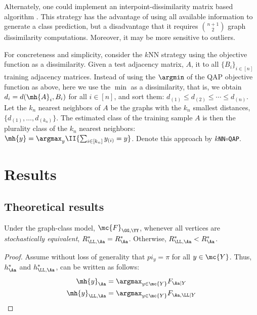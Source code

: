 \documentclass[10pt,journal,cspaper,compsoc]{IEEEtran}
\begin{document}
Alternately, one could implement an interpoint-dissimilarity matrix based algorithm \cite{Duin2011}. This strategy has the advantage of using all available information to generate a class prediction, but a disadvantage that it requires $\binom{n+1}{2}$ graph dissimilarity computations. Moreover, it may be more sensitive to outliers.

For concreteness and simplicity, consider the $k$NN strategy using the \qap objective function as a dissimilarity.  Given a test adjacency matrix, $A$, \qap it to all $\{B_i\}_{i \in [n]}$ training adjacency matrices.  Instead of using the $\argmin$ of the QAP objective function as above, here we use the $\min$ as a dissimilarity, that is, we obtain $d_i=d(\mh{A}_i,B_i)$ for all $i \in [n]$, and sort them: $d_{(1)} \leq d_{(2)} \leq \cdots \leq d_{(n)}$.  Let the $k_n$ nearest neighbors of $A$ be the graphs with the $k_n$ smallest distances, $\{d_{(1)},\ldots, d_{(k_n)}\}$.  The estimated class of the training sample $A$ is then the plurality class of the $k_n$ nearest neighbors: $\mh{y}=\argmax_{y} \II\{\sum_{i \in [k_n]} y_{(i)} = y \}$. Denote this approach by $k$\texttt{NN}$\circ$\texttt{QAP}.








\section{Results}
\label{sec:results}


\subsection{Theoretical results} %
\label{sub:when_to_use_what}



\begin{thm}
	Under the graph-class model, $\mc{F}_{\GG,\YY}$, whenever all vertices are \emph{stochastically equivalent}, $R_{\LL,\Aa}^* = R_{\Aa}^*$.  Otherwise, $R_{\LL,\Aa}^* < R_{\Aa}^*$.
\end{thm} 
\begin{proof}
	Assume without loss of generality that $pi_y=\pi$ for all $y \in \mc{Y}$. Thus, $h_{\Aa}^*$ and $h_{\LL, \Aa}^*$, can be written as follows:
	\begin{align}
		\mh{y}_{\Aa}&=\argmax_{y\in\mc{Y}} F_{\Aa | Y}\\
		\mh{y}_{\LL,\Aa}&=\argmax_{y \in \mc{Y}} F_{\Aa, \LL| Y}
	\end{align}
\end{proof}
\end{document}
